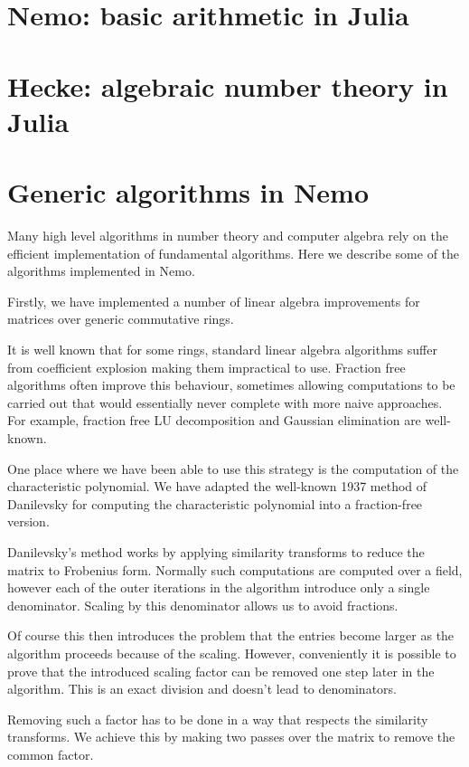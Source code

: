 \documentclass{sig-alternate-05-2015}
\begin{document}
\section{Nemo: basic arithmetic in Julia}

\section{Hecke: algebraic number theory in Julia}

\section{Generic algorithms in Nemo}

Many high level algorithms in number theory and computer algebra rely on
the efficient implementation of fundamental algorithms. Here we describe
some of the algorithms implemented in Nemo.

Firstly, we have implemented a number of linear algebra improvements for
matrices over generic commutative rings.

It is well known that for some rings, standard linear algebra algorithms
suffer from coefficient explosion making them impractical to use. Fraction
free algorithms often improve this behaviour, sometimes allowing computations
to be carried out that would essentially never complete with more naive
approaches. For example, fraction free LU decomposition and Gaussian
elimination are well-known.

One place where we have been able to use this strategy is the computation
of the characteristic polynomial. We have adapted the well-known 1937 method
of Danilevsky for computing the characteristic polynomial into a fraction-free
version.

Danilevsky's method works by applying similarity transforms to reduce the
matrix to Frobenius form. Normally such computations are computed over a
field, however each of the outer iterations in the algorithm introduce only
a single denominator. Scaling by this denominator allows us to avoid
fractions.

Of course this then introduces the problem that the entries become larger
as the algorithm proceeds because of the scaling. However, conveniently
it is possible to prove that the introduced scaling factor can be removed 
one step later in the algorithm. This is an exact division and doesn't
lead to denominators.

Removing such a factor has to be done in a way that respects the
similarity transforms. We achieve this by making two passes over the matrix
to remove the common factor.
\end{document}
